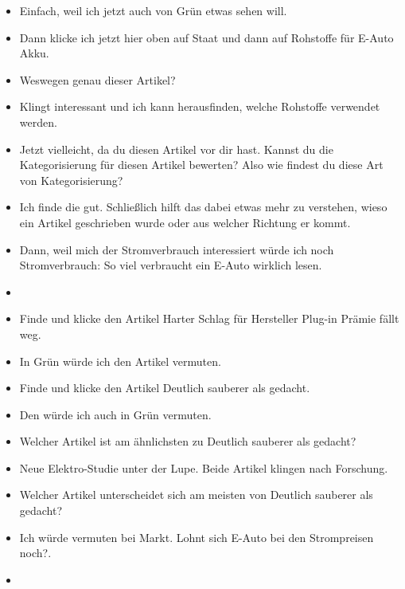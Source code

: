 {\begin{itemize}[]
            \item {} Einfach, weil ich jetzt auch von Grün etwas sehen will.
            \item {} Dann klicke ich jetzt hier oben auf Staat und dann auf \flqq Rohstoffe für E-Auto Akku\frqq{}.
            \item {} Weswegen genau dieser Artikel?
            \item {} Klingt interessant und ich kann herausfinden, welche Rohstoffe verwendet werden.
            \item {} Jetzt vielleicht, da du diesen Artikel vor dir hast.
                  Kannst du die Kategorisierung für diesen Artikel bewerten?
                  Also wie findest du diese Art von Kategorisierung?
            \item {} Ich finde die gut.
                  Schließlich hilft das dabei etwas mehr zu verstehen, wieso ein Artikel geschrieben wurde oder aus welcher Richtung er kommt.
            \item {} Dann, weil mich der Stromverbrauch interessiert würde ich noch \flqq Stromverbrauch: So viel verbraucht ein E-Auto wirklich\frqq{} lesen.
            \item {}
            \item {} Finde und klicke den Artikel \flqq Harter Schlag für Hersteller Plug-in Prämie fällt weg\frqq{}.
            \item {} In Grün würde ich den Artikel vermuten.
            \item {} Finde und klicke den Artikel \flqq Deutlich sauberer als gedacht\frqq{}.
            \item {} Den würde ich auch in Grün vermuten.
            \item {} Welcher Artikel ist am ähnlichsten zu \flqq Deutlich sauberer als gedacht\frqq{}?
            \item {} \flqq Neue Elektro-Studie unter der Lupe\frqq{}. Beide Artikel klingen nach Forschung.
            \item {} Welcher Artikel unterscheidet sich am meisten von \flqq Deutlich sauberer als gedacht\frqq{}?
            \item {} Ich würde vermuten bei Markt. \flqq Lohnt sich E-Auto bei den Strompreisen noch?\frqq{}.
            \item {}

\end{itemize}}
